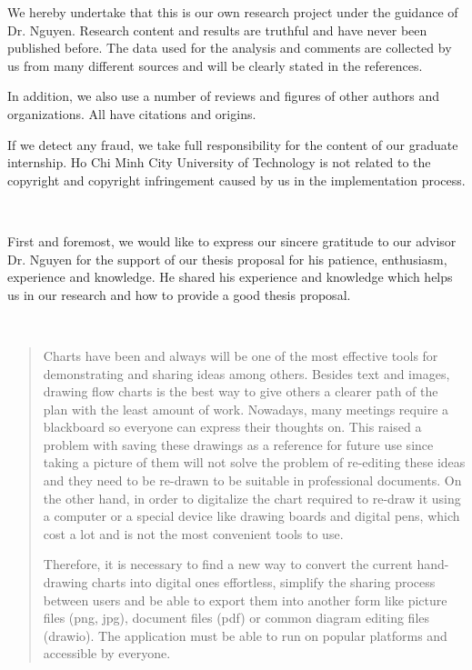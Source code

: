 \documentclass[12pt,a4paper,oneside]{book} %
\begin{document}
\coverpage

\frontmatter

\begin{declaration}
We hereby undertake that this is our own research project under the guidance of Dr. Nguyen. Research content and results are truthful and have never been published before. The data used for the analysis and comments are collected by us from many different sources and will be clearly stated in the references.

In addition, we also use a number of reviews and figures of other authors and organizations. All have citations and origins.

If we detect any fraud, we take full responsibility for the content of our graduate internship. Ho Chi Minh City University of Technology is not related to the copyright and copyright infringement caused by us in the implementation process.

\end{declaration}
~

\begin{acknowledgments}

First and foremost, we would like to express our sincere gratitude to our advisor Dr. Nguyen for the support of our thesis proposal for his patience, enthusiasm, experience and knowledge. He shared his experience and knowledge which helps us in our research and how to provide a good thesis proposal.
\end{acknowledgments}
~

%
\begin{abstract}
Charts have been and always will be one of the most effective tools for demonstrating and sharing ideas among others. Besides text and images, drawing flow charts is the best way to give others a clearer path of the plan with the least amount of work. Nowadays, many meetings require a blackboard so everyone can express their thoughts on. This raised a problem with saving these drawings as a reference for future use since taking a picture of them will not solve the problem of re-editing these ideas and they need to be re-drawn to be suitable in professional documents. On the other hand, in order to digitalize the chart required to re-draw it using a computer or a special device like drawing boards and digital pens, which cost a lot and is not the most convenient tools to use.

Therefore, it is necessary to find a new way to convert the current hand-drawing charts into digital ones effortless, simplify the sharing process between users and be able to export them into another form like picture files (png, jpg), document files (pdf) or common diagram editing files (drawio). The application must be able to run on popular platforms and accessible by everyone.
\end{abstract}
 
\end{document}
